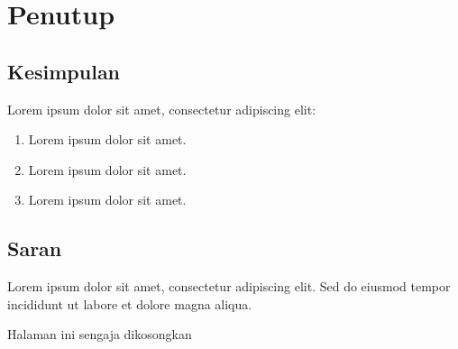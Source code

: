 \chapter{Penutup}
\section{Kesimpulan}
Lorem ipsum dolor sit amet, consectetur adipiscing elit:
\begin{enumerate}
    \item Lorem ipsum dolor sit amet.
    \item Lorem ipsum dolor sit amet.
    \item Lorem ipsum dolor sit amet.
\end{enumerate}

\section{Saran}
Lorem ipsum dolor sit amet, consectetur adipiscing elit. Sed do eiusmod tempor incididunt ut labore et dolore magna aliqua.

\newpage
\thispagestyle{empty}
\vspace*{\fill}
    \begin{center}
        Halaman ini sengaja dikosongkan
    \end{center}
\vspace*{\fill}
\pagebreak
